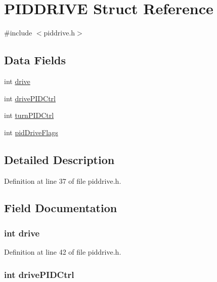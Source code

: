 \hypertarget{struct_p_i_d_d_r_i_v_e}{
\section{PIDDRIVE Struct Reference}
\label{struct_p_i_d_d_r_i_v_e}
}


{\ttfamily \#include $<$piddrive.h$>$}

\subsection*{Data Fields}
\begin{DoxyCompactItemize}
\item 
int \hyperlink{struct_p_i_d_d_r_i_v_e_a0579263a33cc0031ef0c5b1d37743ae9}{drive}
\item 
int \hyperlink{struct_p_i_d_d_r_i_v_e_af65f01832db56601e11a11adcafdf460}{drivePIDCtrl}
\item 
int \hyperlink{struct_p_i_d_d_r_i_v_e_a48733e2c74e55078449a4b3807a4989a}{turnPIDCtrl}
\item 
int \hyperlink{struct_p_i_d_d_r_i_v_e_a0519325409baca0bbad955a014bfdcad}{pidDriveFlags}
\end{DoxyCompactItemize}


\subsection{Detailed Description}


Definition at line 37 of file piddrive.h.



\subsection{Field Documentation}
\hypertarget{struct_p_i_d_d_r_i_v_e_a0579263a33cc0031ef0c5b1d37743ae9}{
\subsubsection[{drive}]{\setlength{\rightskip}{0pt plus 5cm}int {\bf drive}}}
\label{struct_p_i_d_d_r_i_v_e_a0579263a33cc0031ef0c5b1d37743ae9}


Definition at line 42 of file piddrive.h.

\hypertarget{struct_p_i_d_d_r_i_v_e_af65f01832db56601e11a11adcafdf460}{
\subsubsection[{drivePIDCtrl}]{\setlength{\rightskip}{0pt plus 5cm}int {\bf drivePIDCtrl}}}
\label{struct_p_i_d_d_r_i_v_e_af65f01832db56601e11a11adcafdf460}


